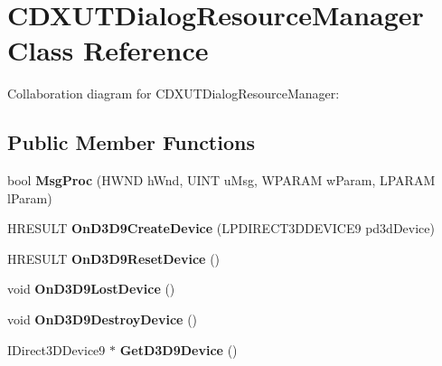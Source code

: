 \hypertarget{class_c_d_x_u_t_dialog_resource_manager}{\section{C\+D\+X\+U\+T\+Dialog\+Resource\+Manager Class Reference}
\label{class_c_d_x_u_t_dialog_resource_manager}
}


Collaboration diagram for C\+D\+X\+U\+T\+Dialog\+Resource\+Manager\+:
\subsection*{Public Member Functions}
\begin{DoxyCompactItemize}
\item 
\hypertarget{class_c_d_x_u_t_dialog_resource_manager_a5eb2225e9b52752735c7557734bc009d}{bool {\bfseries Msg\+Proc} (H\+W\+N\+D h\+Wnd, U\+I\+N\+T u\+Msg, W\+P\+A\+R\+A\+M w\+Param, L\+P\+A\+R\+A\+M l\+Param)}\label{class_c_d_x_u_t_dialog_resource_manager_a5eb2225e9b52752735c7557734bc009d}

\item 
\hypertarget{class_c_d_x_u_t_dialog_resource_manager_a94197bd3fe8e85434ef48f97c60d4ea3}{H\+R\+E\+S\+U\+L\+T {\bfseries On\+D3\+D9\+Create\+Device} (L\+P\+D\+I\+R\+E\+C\+T3\+D\+D\+E\+V\+I\+C\+E9 pd3d\+Device)}\label{class_c_d_x_u_t_dialog_resource_manager_a94197bd3fe8e85434ef48f97c60d4ea3}

\item 
\hypertarget{class_c_d_x_u_t_dialog_resource_manager_a3f66ec6e184445b32e4052c367297132}{H\+R\+E\+S\+U\+L\+T {\bfseries On\+D3\+D9\+Reset\+Device} ()}\label{class_c_d_x_u_t_dialog_resource_manager_a3f66ec6e184445b32e4052c367297132}

\item 
\hypertarget{class_c_d_x_u_t_dialog_resource_manager_af09c16cd6e385d1f71cd49b8599f73b0}{void {\bfseries On\+D3\+D9\+Lost\+Device} ()}\label{class_c_d_x_u_t_dialog_resource_manager_af09c16cd6e385d1f71cd49b8599f73b0}

\item 
\hypertarget{class_c_d_x_u_t_dialog_resource_manager_a8b9dc2959a95b22c94ef9b26037dcff5}{void {\bfseries On\+D3\+D9\+Destroy\+Device} ()}\label{class_c_d_x_u_t_dialog_resource_manager_a8b9dc2959a95b22c94ef9b26037dcff5}

\item 
\hypertarget{class_c_d_x_u_t_dialog_resource_manager_a61ebb106a9fcc49e9eba0a50a7914f5a}{I\+Direct3\+D\+Device9 $\ast$ {\bfseries Get\+D3\+D9\+Device} ()}\label{class_c_d_x_u_t_dialog_resource_manager_a61ebb106a9fcc49e9eba0a50a7914f5a}


\end{DoxyCompactItemize}
